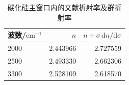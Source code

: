 \begin{table}[htbp]\centering
\caption{碳化硅主窗口内的文献折射率及群折射率}\label{tab:sic-index}
\begin{tabular}{lrr}
\toprule
波数/$\mathrm{cm}^{-1}$ & $n$ & $n+\sigma\,\mathrm{d}n/\mathrm{d}\sigma$\\\midrule
2000 & 2.443966 & 2.727559\\
2500 & 2.493330 & 2.662306\\
3300 & 2.528109 & 2.618570\\
\bottomrule
\end{tabular}\end{table}
